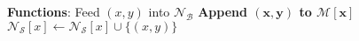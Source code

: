 \documentclass[10]{article}
\newcommand{\push}[1]{\text{push} \left ( #1 \right )}
\newcommand{\pop}{\text{pop}()}
\newcommand{\algoname}[1]{\textnormal{\textsc{#1}}}
\begin{document}
\begin{algorithm}[htbp]
\begin{flushleft}
\end{flushleft}
\begin{flushleft}
\begin{algorithmic}[1]
	\Statex \textbf{Functions}:
				\State Feed $(x,y)$ into $\mathcal{N}_\mathcal{B}$
				\State \textbf{Append $\boldsymbol{(x,y)}$ to $\boldsymbol{\mathcal{M}[x]}$}
			\Else
				\State $\mathcal{N}_\mathcal{S}[x] \gets \mathcal{N}_\mathcal{S}[x] \cup \{(x, y)\}$
			\EndIf
		\EndFunction

\end{algorithmic}
\end{flushleft}
\end{algorithm}
\end{document}
